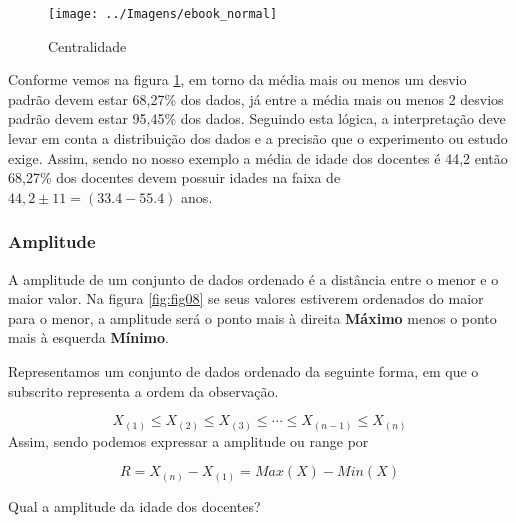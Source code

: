 \documentclass[11pt,]{style/krantz}
\makeatletter
\newenvironment{Shaded}{\begin{snugshade}}{\end{snugshade}}
\newcommand{\CommentTok}[1]{\textcolor[rgb]{0.56,0.35,0.01}{\textit{#1}}}
\newcommand{\DataTypeTok}[1]{\textcolor[rgb]{0.13,0.29,0.53}{#1}}
\newcommand{\DecValTok}[1]{\textcolor[rgb]{0.00,0.00,0.81}{#1}}
\newcommand{\KeywordTok}[1]{\textcolor[rgb]{0.13,0.29,0.53}{\textbf{#1}}}
\newcommand{\NormalTok}[1]{#1}
\newcommand{\OperatorTok}[1]{\textcolor[rgb]{0.81,0.36,0.00}{\textbf{#1}}}
\newcommand{\OtherTok}[1]{\textcolor[rgb]{0.56,0.35,0.01}{#1}}
\newcommand{\StringTok}[1]{\textcolor[rgb]{0.31,0.60,0.02}{#1}}
\newenvironment{kframe}{%
\medskip{}
\setlength{\fboxsep}{.8em}
 \def\at@end@of@kframe{}%
 \ifinner\ifhmode%
  \def\at@end@of@kframe{\end{minipage}}%
  \begin{minipage}{\columnwidth}%
 \fi\fi%
 \def\FrameCommand##1{\hskip\@totalleftmargin \hskip-\fboxsep
 \colorbox{shadecolor}{##1}\hskip-\fboxsep
     \hskip-\linewidth \hskip-\@totalleftmargin \hskip\columnwidth}%
 \MakeFramed {\advance\hsize-\width
   \@totalleftmargin\z@ \linewidth\hsize
   \@setminipage}}%
 {\par\unskip\endMakeFramed%
 \at@end@of@kframe}
\renewenvironment{Shaded}{\begin{kframe}}{\end{kframe}}
\theoremstyle{definition}
\theoremstyle{definition}
\theoremstyle{definition}
\theoremstyle{remark}
\let\BeginKnitrBlock\begin \let\EndKnitrBlock\end
\makeatother
\begin{document}
\begin{figure}[H]

{\centering \texttt{[image: ../Imagens/ebook\_normal]} 

}

\caption{Centralidade}\label{fig:fig09}
\end{figure}

Conforme vemos na figura \ref{fig:fig09}, em torno da média mais ou menos um desvio padrão devem estar 68,27\% dos dados, já entre a média mais ou menos 2 desvios padrão devem estar 95,45\% dos dados. Seguindo esta lógica, a interpretação deve levar em conta a distribuição dos dados e a precisão que o experimento ou estudo exige. Assim, sendo no nosso exemplo a média de idade dos docentes é 44,2 então 68,27\% dos docentes devem possuir idades na faixa de \(44,2 \pm 11 = (33.4-55.4)\) anos.

\hypertarget{amplitude}{%
\subsubsection{Amplitude}\label{amplitude}}

A amplitude de um conjunto de dados ordenado é a distância entre o menor e o maior valor. Na figura \ref{fig:fig08} se seus valores estiverem ordenados do maior para o menor, a amplitude será o ponto mais à direita \textbf{Máximo} menos o ponto mais à esquerda \textbf{Mínimo}.

Representamos um conjunto de dados ordenado da seguinte forma, em que o subscrito representa a ordem da observação.

\[X_{(1)}\leq X_{(2)}\leq X_{(3)}\leq \cdots \leq X_{(n-1)}\leq X_{(n)}\]
Assim, sendo podemos expressar a amplitude ou range por

\[R = X_{(n)} - X_{(1)} = Max(X) - Min(X)\]

\BeginKnitrBlock{example}
\protect\hypertarget{exm:unnamed-chunk-65}{}{\label{exm:unnamed-chunk-65} }Qual a amplitude da idade dos docentes?
\EndKnitrBlock{example}

\begin{Shaded}
\end{Shaded}
\end{document}

